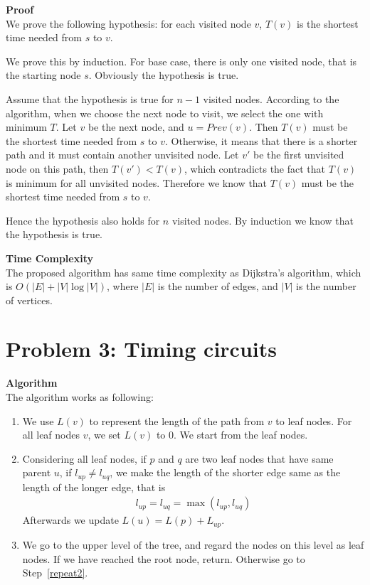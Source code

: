 \documentclass{article}
\newcommand{\Complexity}{\vspace{0.3cm} \noindent\textbf{Time Complexity} \\}
\newcommand{\Proof}{\vspace{0.3cm} \noindent\textbf{Proof} \\}
\newcommand{\Algorithm}{\textbf{Algorithm} \\}
\begin{document}
\Proof
We prove the following hypothesis: for each visited node $v$, $T(v)$ is the shortest time needed from $s$ to
$v$. 

We prove this by induction.
For base case, there is only one visited node, that is the starting node $s$. Obviously the
hypothesis is true.

Assume that the hypothesis is true for $n-1$ visited nodes. According to the algorithm, when we
choose the next node to visit, we select the one with minimum $T$. 
Let $v$ be the next node, and $u = Prev(v)$. Then $T(v)$ must be the shortest time needed from 
$s$ to $v$. 
Otherwise, it means that there is a shorter path and it must contain another unvisited node.
Let $v'$ be the first unvisited node on this path, then $T(v') < T(v)$, which
contradicts the fact that $T(v)$ is minimum for all unvisited nodes. Therefore we know that 
$T(v)$ must be the shortest time needed from $s$ to $v$.

Hence the hypothesis also holds for $n$ visited nodes. By induction we know that the hypothesis is
true.

\Complexity
The proposed algorithm has same time complexity as Dijkstra's algorithm, which is $O(|E| +
|V|\log|V|)$, where $|E|$ is the number of edges, and $|V|$ is the number of vertices.

\section*{Problem 3: Timing circuits}
\Algorithm
The algorithm works as following:
\begin{enumerate}
\item We use $L(v)$ to represent the length of the path from $v$ to leaf nodes. For all leaf nodes $v$, 
we set $L(v)$ to $0$. We start from the leaf nodes.

\item \label{repeat2} 
  Considering all leaf nodes, if $p$ and $q$ are two leaf nodes that have same parent $u$, 
if $l_{up} \neq l_{uq}$, we make the length of the shorter edge same as the length of the longer
edge, that is
\begin{align}
  l_{up} = l_{uq} = \max(l_{up}, l_{uq})
\end{align}
Afterwards we update $L(u) = L(p) + L_{up}$.

\item We go to the upper level of the tree, and regard the nodes on this level as leaf nodes. 
  If we have reached the root node, return.
  Otherwise go to Step~\ref{repeat2}.
\end{enumerate}
\end{document}
